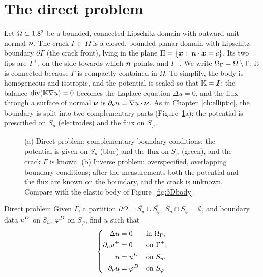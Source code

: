 \section{The direct problem}\label{sec:rg-direct}
%
Let $\Omega\subset1.8^3$ be a bounded, connected Lipschitz domain with outward unit normal $\bm{\nu}$. The crack $\Gamma\subset\Omega$ is a closed, bounded planar domain with Lipschitz boundary $\partial\Gamma$ (the crack front), lying in the plane $\Pi=\{\bm{x}:\ \bm{n}\cdot\bm{x}=c\}$. Its two lips are $\Gamma^+$, on the side towards which $\bm{n}$ points, and $\Gamma^-$. We write $\Omega_\Gamma=\Omega\setminus\Gamma$; it is connected because $\Gamma$ is compactly contained in $\Omega$. To simplify, the body is homogeneous and isotropic, and the potential is scaled so that $\mathbb{K}=\bm{I}$: the balance $\operatorname{div}(\mathbb{K}\nabla u)=0$ becomes the Laplace equation $\Delta u=0$, and the flux through a surface of normal $\bm{\nu}$ is $\partial_\nu u=\nabla u\cdot\bm{\nu}$. As in Chapter~\ref{ch:elliptic}, the boundary is split into two complementary parts (Figure~\ref{fig:rg-problems}a): the potential is prescribed on $S_u$ (electrodes) and the flux on $S_\varphi$.

\begin{figure}[h]
\centering

\caption{(a) Direct problem: complementary boundary conditions; the potential
is given on $S_u$ (blue) and the flux on $S_\varphi$ (green), and the crack
$\Gamma$ is known. (b) Inverse problem: overspecified, overlapping boundary
conditions; after the measurements both the potential and the flux are known
on the boundary, and the crack is unknown. Compare with the elastic body of
Figure~\ref{fig:3Dbody}.}
\label{fig:rg-problems}
\end{figure}

\begin{gbox}{Direct problem}
Given $\Gamma$, a partition $\partial\Omega=\overline{S_u}\cup\overline{S_\varphi}$, $S_u\cap S_\varphi=\emptyset$, and boundary data $u^{D}$ on $S_u$, $\varphi^{D}$ on $S_\varphi$, find $u$ such that
\begin{equation}\label{eq:rg-direct}
\left\{\begin{aligned}
\Delta u&=0 &&\text{in }\Omega_\Gamma,\\
\partial_n u^\pm&=0 &&\text{on }\Gamma^\pm,\\
u&=u^{D} &&\text{on }S_u,\\
\partial_\nu u&=\varphi^{D} &&\text{on }S_\varphi .
\end{aligned}\right.
\end{equation}
\end{gbox}

